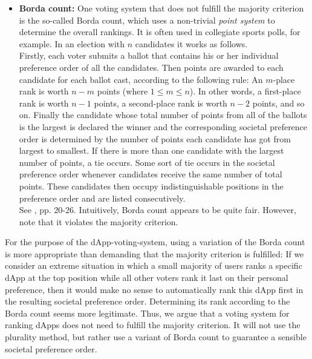 \begin{itemize}[leftmargin = 0pt, nosep] 
\item \textbf{Borda count:} One voting system that does not fulfill the majority criterion is the so-called Borda count, which uses a non-trivial {\emph{point system}} to determine the overall rankings. 
It is often used in collegiate sports polls, for example. In an election with $n$ candidates it works as follows.\\
Firstly, each voter submits a ballot that contains his or her individual preference order of all the candidates.
Then points are awarded to each candidate for each ballot cast, according to the following rule: 
An $m$-place rank is worth $n-m$ points (where $1\leq{m}\leq{n}$). In other words, a first-place rank is worth $n-1$ points, a second-place rank is worth $n-2$ points, and so on.
Finally the candidate whose total number of points from all of the ballots is the largest is declared the winner and the corresponding societal preference order is determined by the number of points each candidate has got from largest to smallest. 
If there is more than one candidate with the largest number of points, a tie occurs. 
Some sort of tie occurs in the societal preference order whenever candidates receive the same number of total points. 
These candidates then occupy indistinguishable positions in the preference order and are listed consecutively.\\
See \cite{voting}, pp. 20-26. Intuitively, Borda count appears to be quite fair. However, note that it violates the majority criterion. \\
\end{itemize}
 
For the purpose of the dApp-voting-system, using a variation of the Borda count is more appropriate than demanding that the majority criterion is fulfilled: If we consider an extreme situation in which a small majority of users ranks a specific dApp at the top position while all other voters rank it last on their personal preference, then it would make no sense to automatically rank this dApp first in the resulting societal preference order. Determining its rank according to the Borda count seems more legitimate. Thus, we argue that a voting system for ranking dApps does not need to fulfill the majority criterion. It will not use the plurality method, but rather use a variant of Borda count to guarantee a sensible societal preference order. \\


